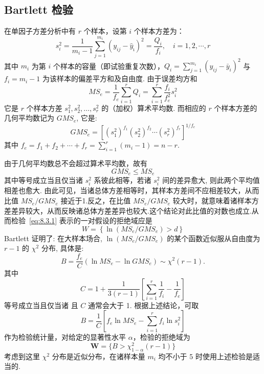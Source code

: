 \subsection{Bartlett 检验}
在单因子方差分析中有 $r$ 个样本，设第 $i$ 个样本方差为：
\begin{equation*}
  s_{i}^{2}=\frac{1}{m_{i}-1} \sum_{j=1}^{m_{i}}\left(y_{i j}-\hat{y}_{\imath}\right)^{2}=\frac{Q_{i}}{f_{i}}, \quad i=1,2, \cdots, r
\end{equation*}
其中 $m_i$ 为第 $i$ 个样本的容量（即试验重复次数），$Q_i = \sum_{j=1}^{m_i} (y_{ij} - \bar{y}_i)^2$ 与 $f_i =m_i -1$ 为该样本的偏差平方和及自由度. 由于误差均方和
\begin{equation*}
  M S_{e}=\frac{1}{f_{e}} \sum_{i=1}^{r} Q_{i}=\sum_{i=1}^{r} \frac{f_{i}}{f_{e}^{2}} s_{i}^{2}
\end{equation*}
它是 $r$ 个样本方差 $s_1^2,s_2^2, \ldots, s_r^2$ 的（加权）算术平均数. 而相应的 $r$ 个样本方差的几何平均数记为 $GMS_e$, 它是:
\begin{equation*}
  GMS_e = [(s_1^2)^{f_1}(s_2^2)^{f_2} \cdots (s_r^2)^{f_r}]^{1/f_e}
\end{equation*}
其中 $f_e = f_1 + f_2 + \cdots + f_r = \sum_{i=1}^r(m_i - 1) = n-r$.

由于几何平均数总不会超过算术平均数，故有
\begin{equation}
  GMS_e \leq MS_e
\end{equation}
其中等号成立当且仅当诸 $s_i^2$ 系彼此相等，若诸 $s_i^2$ 间的差异愈大, 则此两个平均值相差也愈大. 由此可见，当诸总体方差相等时，其样本方差间不应相差较大，从而比值 $MS_e/GMS_e$ 接近于1.反之，在比值 $MS_e/GMS_e$ 较大时，就意味着诸样本方差差异较大，从而反映诸总体方差差异也较大.这个结论对此比值的对数也成立.从而检验~\eqref{eq:8.3.1} 表示的一对假设的拒绝域应是
\begin{equation}\label{eq:8.3.4}
  W=\left\{\ln \left(M S_{e} / G M S_{e}\right)>d\right\}
\end{equation}
Bartlett 证明了: 在大样本场合, $\ln(MS_e/GMS_e)$ 的某个函数近似服从自由度为 $r-1$ 的 $\chi^2$ 分布, 具体是:
\begin{equation}\label{eq:8.3.5}
  B=\frac{f_{e}}{C}(\ln M S_{e}-\ln G M S_{e}) \sim \chi^{2}(r-1).
\end{equation}
其中
\begin{equation}\label{eq:8.3.6}
  C = 1 + \frac{1}{3(r-1)} \left[\sum_{i=1}^{r} \frac{1}{f_{i}}-\frac{1}{f_{e}}\right]
\end{equation}
等号成立当且仅当诸
且 $C$ 通常会大于 1. 根据上述结论，可取
\begin{equation}\label{eq:8.3.7}
  B=\frac{1}{C}\left[f_{e} \ln M S_{e}-\sum_{i=1}^{r} f_{i} \ln s_{i}^{2}\right]
\end{equation}
作为检验统计量，对给定的显著性水平 $\alpha$，检验的拒绝域为
\begin{equation}
  \boldsymbol{W}=\{ B>\chi_{1-\alpha}^{2}(r-1) \}
\end{equation}
考虑到这里 $\chi^2$ 分布是近似分布，在诸样本量 $m_i$ 均不小于 5 时使用上述检验是适当的.

